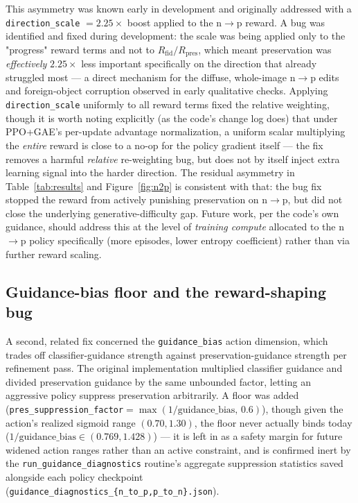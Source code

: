\documentclass[11pt]{article}
\begin{document}
This asymmetry was known early in development and originally addressed
with a \texttt{direction\_scale} $=2.25\times$ boost applied to the n$\to$p
reward. A bug was identified and fixed during development: the scale was
being applied only to the "progress" reward terms and not to
$R_{\text{fid}}/R_{\text{pres}}$, which meant preservation was
\emph{effectively} $2.25\times$ less important specifically on the
direction that already struggled most — a direct mechanism for the
diffuse, whole-image n$\to$p edits and foreign-object corruption observed
in early qualitative checks. Applying \texttt{direction\_scale} uniformly
to all reward terms fixed the relative weighting, though it is worth
noting explicitly (as the code's change log does) that under PPO+GAE's
per-update advantage normalization, a uniform scalar multiplying the
\emph{entire} reward is close to a no-op for the policy gradient itself —
the fix removes a harmful \emph{relative} re-weighting bug, but does not
by itself inject extra learning signal into the harder direction. The
residual asymmetry in Table~\ref{tab:results} and Figure~\ref{fig:n2p} is
consistent with that: the bug fix stopped the reward from actively
punishing preservation on n$\to$p, but did not close the underlying
generative-difficulty gap. Future work, per the code's own guidance,
should address this at the level of \emph{training compute} allocated to
the n$\to$p policy specifically (more episodes, lower entropy
coefficient) rather than via further reward scaling.

\subsection{Guidance-bias floor and the reward-shaping bug}

A second, related fix concerned the \texttt{guidance\_bias} action
dimension, which trades off classifier-guidance strength against
preservation-guidance strength per refinement pass. The original
implementation multiplied classifier guidance and divided preservation
guidance by the same unbounded factor, letting an aggressive policy
suppress preservation arbitrarily. A floor was added
(\texttt{pres\_suppression\_factor}$=\max(1/\text{guidance\_bias},\,0.6)$),
though given the action's realized sigmoid range $(0.70, 1.30)$, the
floor never actually binds today ($1/\text{guidance\_bias} \in (0.769,
1.428)$) — it is left in as a safety margin for future widened action
ranges rather than an active constraint, and is confirmed inert by the
\texttt{run\_guidance\_diagnostics} routine's aggregate suppression
statistics saved alongside each policy checkpoint
(\texttt{guidance\_diagnostics\_\{n\_to\_p,p\_to\_n\}.json}).
\end{document}
